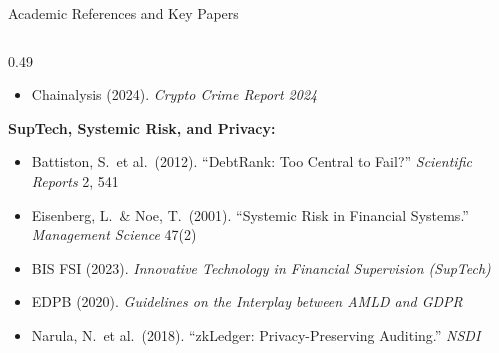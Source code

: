 \begin{frame}{Academic References and Key Papers}
\begin{columns}[T]
\begin{column}{0.49\textwidth}
\begin{itemize}
        \item Chainalysis (2024). \emph{Crypto Crime Report 2024}
      \end{itemize}
      \vspace{0.4em}
      \textbf{SupTech, Systemic Risk, and Privacy:}
      \begin{itemize}\small
        \item Battiston, S.\ et al.\ (2012). ``DebtRank: Too Central to Fail?'' \emph{Scientific Reports} 2, 541
        \item Eisenberg, L.\ \& Noe, T.\ (2001). ``Systemic Risk in Financial Systems.'' \emph{Management Science} 47(2)
        \item BIS FSI (2023). \emph{Innovative Technology in Financial Supervision (SupTech)}
        \item EDPB (2020). \emph{Guidelines on the Interplay between AMLD and GDPR}
        \item Narula, N.\ et al.\ (2018). ``zkLedger: Privacy-Preserving Auditing.'' \emph{NSDI}
      \end{itemize}
    \end{column}
  \end{columns}
\end{frame}


